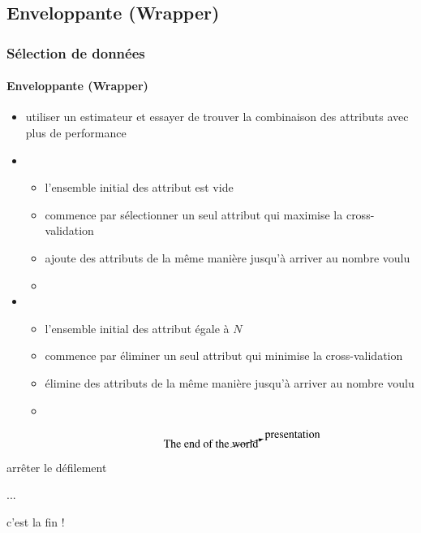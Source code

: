 \documentclass[xcolor=table]{beamer}
\begin{document}
\subsection{Enveloppante (Wrapper)}

\begin{frame}
	\frametitle{Sélection de données}
	\framesubtitle{Enveloppante (Wrapper)}
	
	\begin{itemize}
		\item utiliser un estimateur et essayer de trouver la combinaison des attributs avec plus de performance
		\item {}
		\begin{itemize}
			\item l'ensemble initial des attribut est vide
			\item commence par sélectionner un seul attribut qui maximise la cross-validation
			\item ajoute des attributs de la même manière jusqu'à arriver au nombre voulu
			\item {}
		\end{itemize}
		\item {}
		\begin{itemize}
			\item l'ensemble initial des attribut égale à $N$
			\item commence par éliminer un seul attribut qui minimise la cross-validation
			\item élimine des attributs de la même manière jusqu'à arriver au nombre voulu
			\item {}
		\end{itemize}
	\end{itemize}
	
\end{frame}


\begin{frame}
	
	\Huge 
	\[
	\text{The end of the } \cancelto{\text{presentation}}{\text{world}}
	\]
	
\end{frame}

\begin{frame}
	
	\begin{center}
		\Huge 
		arrêter le défilement 
		
		... 
		
		c'est la fin !
	\end{center}
	
\end{frame}



\end{document}
